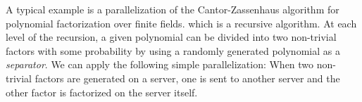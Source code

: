 %
%
%
A typical example is a parallelization of the Cantor-Zassenhaus
algorithm for polynomial factorization over finite fields.
which is a recursive algorithm.
At each level of the recursion, a given polynomial can be
divided into two non-trivial factors with some probability by using 
a randomly generated polynomial as a {\it separator}.
We can apply the following simple parallelization:
When two non-trivial factors are generated on a server,
one is sent to another server and the other factor is factorized on the server
itself. 
